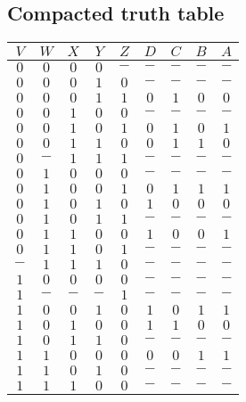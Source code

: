 \documentclass [15pt,a4paper,twoside]{article}
\begin{document}
\subsection{Compacted truth table}
\begin{center}
	\begin{tabular}{ccccc|cccc}
		$V$ & $W$ & $X$ & $Y$ & $Z$ & $D$ & $C$ & $B$ & $A$ \\
		\hline
		$0$ & $0$ & $0$ & $0$ & $-$ & $-$ & $-$ & $-$ & $-$ \\
		$0$ & $0$ & $0$ & $1$ & $0$ & $-$ & $-$ & $-$ & $-$ \\
		$0$ & $0$ & $0$ & $1$ & $1$ & $0$ & $1$ & $0$ & $0$ \\
		$0$ & $0$ & $1$ & $0$ & $0$ & $-$ & $-$ & $-$ & $-$ \\
		$0$ & $0$ & $1$ & $0$ & $1$ & $0$ & $1$ & $0$ & $1$ \\
		$0$ & $0$ & $1$ & $1$ & $0$ & $0$ & $1$ & $1$ & $0$ \\
		$0$ & $-$ & $1$ & $1$ & $1$ & $-$ & $-$ & $-$ & $-$ \\
		$0$ & $1$ & $0$ & $0$ & $0$ & $-$ & $-$ & $-$ & $-$ \\
		$0$ & $1$ & $0$ & $0$ & $1$ & $0$ & $1$ & $1$ & $1$ \\
		$0$ & $1$ & $0$ & $1$ & $0$ & $1$ & $0$ & $0$ & $0$ \\
		$0$ & $1$ & $0$ & $1$ & $1$ & $-$ & $-$ & $-$ & $-$ \\
		$0$ & $1$ & $1$ & $0$ & $0$ & $1$ & $0$ & $0$ & $1$ \\
		$0$ & $1$ & $1$ & $0$ & $1$ & $-$ & $-$ & $-$ & $-$ \\
		$-$ & $1$ & $1$ & $1$ & $0$ & $-$ & $-$ & $-$ & $-$ \\
		$1$ & $0$ & $0$ & $0$ & $0$ & $-$ & $-$ & $-$ & $-$ \\
		$1$ & $-$ & $-$ & $-$ & $1$ & $-$ & $-$ & $-$ & $-$ \\
		$1$ & $0$ & $0$ & $1$ & $0$ & $1$ & $0$ & $1$ & $1$ \\
		$1$ & $0$ & $1$ & $0$ & $0$ & $1$ & $1$ & $0$ & $0$ \\
		$1$ & $0$ & $1$ & $1$ & $0$ & $-$ & $-$ & $-$ & $-$ \\
		$1$ & $1$ & $0$ & $0$ & $0$ & $0$ & $0$ & $1$ & $1$ \\
		$1$ & $1$ & $0$ & $1$ & $0$ & $-$ & $-$ & $-$ & $-$ \\
		$1$ & $1$ & $1$ & $0$ & $0$ & $-$ & $-$ & $-$ & $-$ \\
		
	\end{tabular}
\end{center}
\end{document}
